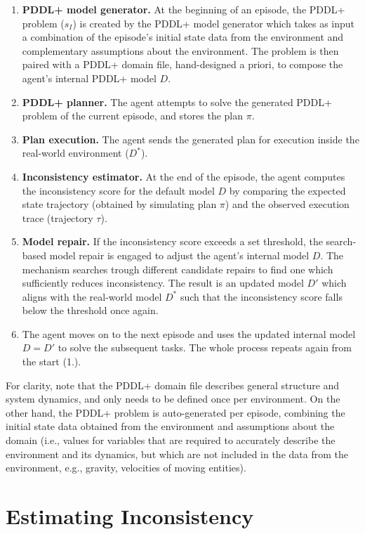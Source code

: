 \documentclass[letterpaper]{article} %
\begin{document}
\begin{enumerate}
\item \textbf{PDDL+ model generator.} At the beginning of an episode, the PDDL+ problem ($s_I$) is created by the PDDL+ model generator which takes as input a combination of the episode's initial state data from the environment and complementary assumptions about the environment. The problem is then paired with a PDDL+ domain file, hand-designed a priori, to compose the agent's internal PDDL+ model $D$.
\item \textbf{PDDL+ planner.} The agent attempts to solve the generated PDDL+ problem of the current episode, and stores the plan $\pi$.
\item \textbf{Plan execution.} The agent sends the generated plan for execution inside the real-world environment ($D^*$).
\item \textbf{Inconsistency estimator.} At the end of the episode, the agent computes the inconsistency score for the default model $D$ by comparing the expected state trajectory (obtained by simulating plan $\pi$) and the observed execution trace (trajectory $\tau$).
\item \textbf{Model repair.} If the inconsistency score exceeds a set threshold, the search-based model repair is engaged to adjust the agent's internal model $D$. The mechanism searches trough different candidate repairs to find one which sufficiently reduces inconsistency. The result is an updated model $D'$ which aligns with the real-world model $D^*$ such that the inconsistency score falls below the threshold once again.
\item The agent moves on to the next episode and uses the updated internal model $D=D'$ to solve the subsequent tasks. The whole process repeats again from the start (1.).
\end{enumerate}

For clarity, note that the PDDL+ domain file describes general structure and system dynamics, and only needs to be defined once per environment. On the other hand, the PDDL+ problem is auto-generated per episode, combining the initial state data obtained from the environment and assumptions about the domain (i.e., values for variables that are required to accurately describe the environment and its dynamics, but which are not included in the data from the environment, e.g., gravity, velocities of moving entities).


\section{Estimating Inconsistency}
\end{document}
